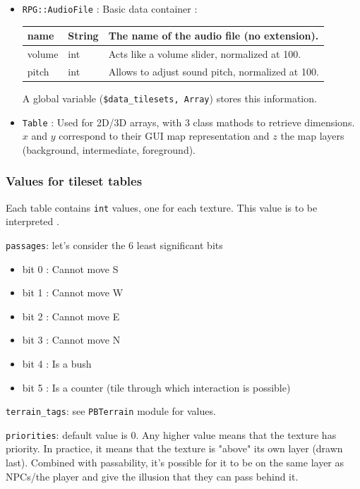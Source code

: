 \documentclass[11pt]{article}
\begin{document}
\begin{itemize}
	\newpage
	\item \verb|RPG::AudioFile| : Basic data container :
	
	\begin{tabular}{|a | l | l|}
	\hline
	{\ttfamily name} & String & The name of the audio file (no extension). \\
	\hline
	{\ttfamily volume} & int & Acts like a volume slider, normalized at 100. \\
	\hline
	{\ttfamily pitch} & int & Allows to adjust sound pitch, normalized at 100. \\
	\hline
	\end{tabular}

	A global variable (\verb|$data_tilesets, Array|) stores this information.

	\item \verb|Table| : Used for 2D/3D arrays, with 3 class mathods to retrieve dimensions. $x$ and $y$ correspond to their GUI map representation and $z$ the map layers (background, intermediate, foreground).
	
\end{itemize}


\subsubsection{Values for tileset tables}

Each table contains \verb|int| values, one for each texture. This value is to be interpreted .

\verb|passages|: let's consider the 6 least significant bits
\begin{itemize}
	\item bit 0 : Cannot move S
	\item bit 1 : Cannot move W
	\item bit 2 : Cannot move E
	\item bit 3 : Cannot move N
	\item bit 4 : Is a bush
	\item bit 5 : Is a counter (tile through which interaction is possible)
\end{itemize}

\verb|terrain_tags|: see \verb|PBTerrain| module for values.


\verb|priorities|: default value is 0. Any higher value means that the texture has priority. In practice, it means that the texture is "above" its own layer (drawn last). Combined with passability, it's possible for it to be on the same layer as NPCs/the player and give the illusion that they can pass behind it. 
\end{document}
